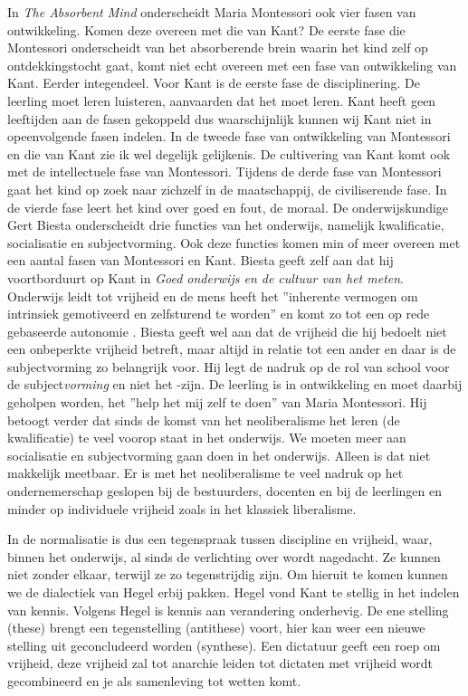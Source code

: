 \documentclass[12pt, a4paper]{article}
\begin{document}
In \emph{The Absorbent Mind} onderscheidt Maria Montessori ook vier fasen van ontwikkeling. Komen deze overeen met die van Kant? De eerste fase die Montessori onderscheidt van het absorberende brein waarin het kind zelf op ontdekkingstocht gaat, komt niet echt overeen met een fase van ontwikkeling van Kant. Eerder integendeel. Voor Kant is de eerste fase de disciplinering. De leerling moet leren luisteren, aanvaarden dat het moet leren. Kant heeft geen leeftijden aan de fasen gekoppeld dus waarschijnlijk kunnen wij Kant niet in opeenvolgende fasen indelen. 
In de tweede fase van ontwikkeling van Montessori en die van Kant zie ik wel degelijk gelijkenis. De cultivering van Kant komt ook met de intellectuele fase van Montessori. Tijdens de derde fase van Montessori gaat het kind op zoek naar zichzelf in de maatschappij, de civiliserende fase. In de vierde fase leert het kind over goed en fout, de moraal. 
De onderwijskundige Gert Biesta onderscheidt drie functies van het onderwijs, namelijk kwalificatie, socialisatie en subjectvorming. Ook deze functies komen min of meer overeen met een aantal fasen van Montessori en Kant. Biesta geeft zelf aan dat hij voortborduurt op Kant in \emph{Goed onderwijs en de cultuur van het meten}. Onderwijs leidt tot vrijheid en de mens heeft het ''inherente vermogen om intrinsiek gemotiveerd en zelfsturend te worden'' en komt zo tot een op rede gebaseerde autonomie \cite[p.77-79]{biesta}. Biesta geeft wel aan dat de vrijheid die hij bedoelt niet een onbeperkte vrijheid betreft, maar altijd in relatie tot een ander en daar is de subjectvorming zo belangrijk voor. Hij legt de nadruk op de rol van school voor de subject\emph{vorming} en niet het -zijn. De leerling is in ontwikkeling en moet daarbij geholpen worden, het ''help het mij zelf te doen'' van Maria Montessori. Hij betoogt verder dat sinds de komst van het neoliberalisme het leren (de kwalificatie) te veel voorop staat in het onderwijs. We moeten meer aan socialisatie en subjectvorming gaan doen in het onderwijs. Alleen is dat niet makkelijk meetbaar. Er is met het neoliberalisme te veel nadruk op het ondernemerschap geslopen bij de bestuurders, docenten en bij de leerlingen en minder op individuele vrijheid zoals in het klassiek liberalisme. 

In de normalisatie is dus een tegenspraak tussen discipline en vrijheid, waar, binnen het onderwijs, al sinds de verlichting over wordt nagedacht. Ze kunnen niet zonder elkaar, terwijl ze zo tegenstrijdig zijn. Om hieruit te komen kunnen we de dialectiek van Hegel erbij pakken. Hegel vond Kant te stellig in het indelen van kennis. Volgens Hegel is kennis aan verandering onderhevig. De ene stelling (these) brengt een tegenstelling (antithese) voort, hier kan weer een nieuwe stelling uit geconcludeerd worden (synthese). Een dictatuur geeft een roep om vrijheid, deze vrijheid zal tot anarchie leiden tot dictaten met vrijheid wordt gecombineerd en je als samenleving tot wetten komt. \cite[p. 180-185]{buckingham}
\end{document}
